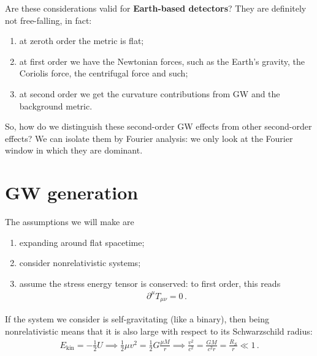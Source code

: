 \documentclass[main.tex]{subfiles}
\begin{document}


Are these considerations valid for \textbf{Earth-based detectors}? 
They are definitely not free-falling, in fact: 
\begin{enumerate}
  \item at zeroth order the metric is flat;
  \item at first order we have the Newtonian forces, such as the Earth's gravity, the Coriolis force, the centrifugal force and such;
  \item at second order we get the curvature contributions from GW and the background metric.
\end{enumerate}

So, how do we distinguish these second-order GW effects from other second-order effects?
We can isolate them by Fourier analysis: we only look at the Fourier window in which they are dominant. 




\section{GW generation}

The assumptions we will make are 
\begin{enumerate}
  \item expanding around flat spacetime;
  \item consider nonrelativistic systems;
  \item assume the stress energy tensor is conserved: to first order, this reads 
  \begin{align}
  \partial^{\mu} T_{\mu \nu } = 0
  \,.
  \end{align}  
\end{enumerate}

If the system we consider is self-gravitating (like a binary), then being nonrelativistic means that it is also large with respect to its Schwarzschild radius:
%
\begin{align}
E _{\text{kin}} = - \frac{1}{2} U \implies 
\frac{1}{2} \mu v^2 = \frac{1}{2} G \frac{\mu M}{r} \implies \frac{v^2}{c^2} = \frac{GM}{c^2 r} = \frac{R_S}{r} \ll 1
\,.
\end{align}
\end{document}
